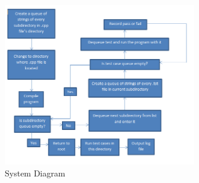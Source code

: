 \begin{figure}[tbh]
\begin{center}
\includegraphics[width=0.75\textwidth]{./flowDiagram}
\end{center}
\caption{System Diagram \label{systemdiagram}}
\end{figure}




